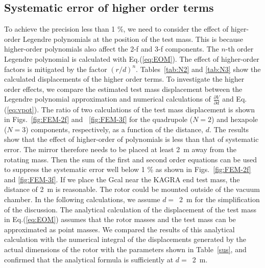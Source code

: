 \documentclass[%
 reprint,
superscriptaddress,
 amsmath,amssymb,
 aps,
]{revtex4-1}
\begin{document}
\subsection{Systematic error of higher order terms}
To achieve the precision less than 1 \%, we need to consider the effect of higer-order Legendre polynomials at the position of the test mass. This is because higher-order polynomials also affect the 2-f and 3-f components. The $n$-th order Legendre polynomial is calculated with Eq.(\ref{eq:EOM}). The effect of higher-order factors is mitigated by the factor $(r/d)^n$. Tables~\ref{tab:N2} and \ref{tab:N3} show the calculated displacements of the higher order terms.
To investigate the higher order effects, we compare the estimated test mass displacement between the Legendre polynomial approximation and numerical calculations of $\frac{\partial V}{\partial{d}}$ and Eq.(\ref{eq:vpot}). The ratio of two calculations of the test mass displacement is shown in Figs.~\ref{fig:FEM-2f} and ~\ref{fig:FEM-3f} for the quadrupole ($N=2$) and hexapole ($N=3$) components, respectively, as a function of the distance, $d$.
The results show that the effect of higher-order of polynomials is less than that of systematic error. The mirror therefore needs to be placed at least 2~m away from the rotating mass. Then the sum of the first and second order equations can be used to suppress the systematic error well below 1 \% as shown in Figs.~\ref{fig:FEM-2f} and \ref{fig:FEM-3f}.
If we place the Gcal near the KAGRA end test mass, the distance of 2~m is reasonable. The rotor could be mounted outside of the vacuum chamber. In the following calculations, we assume $d= $~2~m for the simplification of the discussion. 
The analytical calculation of the displacement of the test mass in Eq.(\ref{eq:EOM}) assumes that the rotor masses and the test mass can be approximated as point masses.
We compared the results of this analytical calculation with the numerical integral of the displacements generated by the actual dimensions of the rotor 
with the parameters shown in Table~\ref{sus}, and confirmed that the analytical formula is sufficiently at $d= $~2~m.
\end{document}
